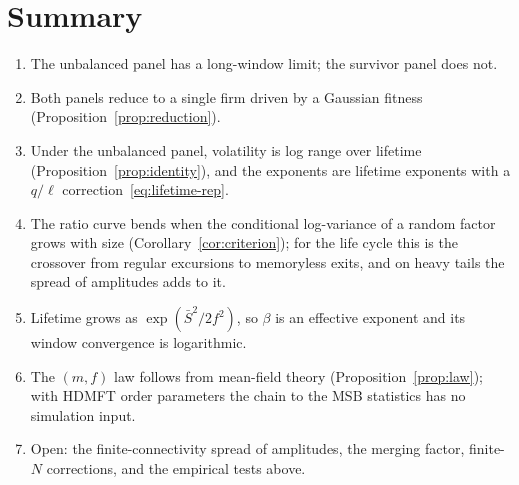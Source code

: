 \documentclass[11pt]{article}
\theoremstyle{remark}
\begin{document}
\section*{Summary}
\begin{enumerate}
  \item The unbalanced panel has a long-window limit; the survivor panel does not.
  \item Both panels reduce to a single firm driven by a Gaussian fitness (Proposition~\ref{prop:reduction}).
  \item Under the unbalanced panel, volatility is log range over lifetime (Proposition~\ref{prop:identity}),
        and the exponents are lifetime exponents with a $q/\ell$ correction~\eqref{eq:lifetime-rep}.
  \item The ratio curve bends when the conditional log-variance of a random factor grows with size
        (Corollary~\ref{cor:criterion}); for the life cycle this is the crossover from regular excursions to
        memoryless exits, and on heavy tails the spread of amplitudes adds to it.
  \item Lifetime grows as $\exp(\bar S^2/2f^2)$, so $\beta$ is an effective exponent and its window
        convergence is logarithmic.
  \item The $(m,f)$ law follows from mean-field theory (Proposition~\ref{prop:law}); with HDMFT order parameters
        the chain to the MSB statistics has no simulation input.
  \item Open: the finite-connectivity spread of amplitudes, the merging factor, finite-$N$ corrections, and the
        empirical tests above.
\end{enumerate}
\end{document}
